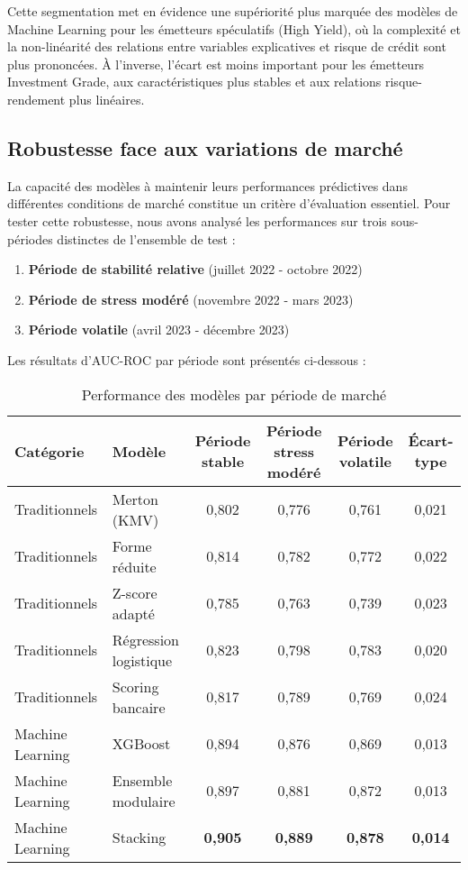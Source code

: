 Cette segmentation met en évidence une supériorité plus marquée des modèles de Machine Learning pour les émetteurs spéculatifs (High Yield), où la complexité et la non-linéarité des relations entre variables explicatives et risque de crédit sont plus prononcées. À l'inverse, l'écart est moins important pour les émetteurs Investment Grade, aux caractéristiques plus stables et aux relations risque-rendement plus linéaires.

\subsection{Robustesse face aux variations de marché}

La capacité des modèles à maintenir leurs performances prédictives dans différentes conditions de marché constitue un critère d'évaluation essentiel. Pour tester cette robustesse, nous avons analysé les performances sur trois sous-périodes distinctes de l'ensemble de test :

\begin{enumerate}
  \item \textbf{Période de stabilité relative} (juillet 2022 - octobre 2022)
  \item \textbf{Période de stress modéré} (novembre 2022 - mars 2023)
  \item \textbf{Période volatile} (avril 2023 - décembre 2023)
\end{enumerate}

Les résultats d'AUC-ROC par période sont présentés ci-dessous :

\begin{table}[htbp]
  \centering
  \caption{Performance des modèles par période de marché}
  \begin{tabular}{llcccc}
    \toprule
    \textbf{Catégorie} & \textbf{Modèle} & \textbf{Période stable} & \textbf{Période stress modéré} & \textbf{Période volatile} & \textbf{Écart-type} \\
    \midrule
    Traditionnels & Merton (KMV) & 0,802 & 0,776 & 0,761 & 0,021 \\
    Traditionnels & Forme réduite & 0,814 & 0,782 & 0,772 & 0,022 \\
    Traditionnels & Z-score adapté & 0,785 & 0,763 & 0,739 & 0,023 \\
    Traditionnels & Régression logistique & 0,823 & 0,798 & 0,783 & 0,020 \\
    Traditionnels & Scoring bancaire & 0,817 & 0,789 & 0,769 & 0,024 \\
    Machine Learning & XGBoost & 0,894 & 0,876 & 0,869 & 0,013 \\
    Machine Learning & Ensemble modulaire & 0,897 & 0,881 & 0,872 & 0,013 \\
    Machine Learning & Stacking & \textbf{0,905} & \textbf{0,889} & \textbf{0,878} & \textbf{0,014} \\
    \bottomrule
  \end{tabular}
\end{table}

